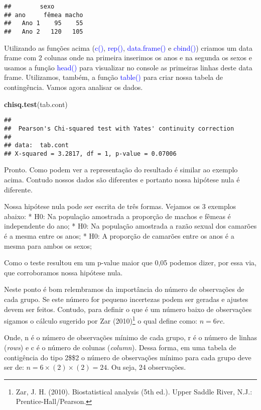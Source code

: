 \documentclass[titlepage, oneside, openany, a4paper]{book}
\newenvironment{Shaded}{\begin{snugshade}}{\end{snugshade}}
\newcommand{\KeywordTok}[1]{\textcolor[rgb]{0.13,0.29,0.53}{\textbf{#1}}}
\newcommand{\NormalTok}[1]{#1}
\begin{document}
\begin{verbatim}
##        sexo
## ano     fêmea macho
##   Ano 1    95    55
##   Ano 2   120   105
\end{verbatim}

Utilizando as funções acima (\textcolor{blue}{c()}, \textcolor{blue}{rep()}, \textcolor{blue}{data.frame()} e \textcolor{blue}{cbind()}) criamos um data frame com 2 colunas onde na primeira inserimos os anos e na segunda os sexos e usamos a função \textcolor{blue}{head()} para visualizar no console as primeiras linhas deste data frame. Utilizamos, também, a função \textcolor{blue}{table()} para criar nossa tabela de contingência. Vamos agora analisar os dados.

\begin{Shaded}
\begin{Highlighting}[]
\KeywordTok{chisq.test}\NormalTok{(tab.cont)}
\end{Highlighting}
\end{Shaded}

\begin{verbatim}
## 
##  Pearson's Chi-squared test with Yates' continuity correction
## 
## data:  tab.cont
## X-squared = 3.2817, df = 1, p-value = 0.07006
\end{verbatim}

Pronto. Como podem ver a representação do resultado é similar ao exemplo acima. Contudo nossos dados são diferentes e portanto nossa hipótese nula é diferente.

Nossa hipótese nula pode ser escrita de três formas. Vejamos os 3 exemplos abaixo:
* H0: Na população amostrada a proporção de machos e fêmeas é independente do ano;
* H0: Na população amostrada a razão sexual dos camarões é a mesma entre os anos;
* H0: A proporção de camarões entre os anos é a mesma para ambos os sexos;

Como o teste resultou em um p-value maior que 0,05 podemos dizer, por essa via, que corroboramos nossa hipótese nula.

Neste ponto é bom relembramos da importância do número de observações de cada grupo. Se este número for pequeno incertezas podem ser geradas e ajustes devem ser feitos. Contudo, para definir o que é um número baixo de observações sigamos o cálculo sugerido por Zar (2010)\footnote{Zar, J. H. (2010). Biostatistical analysis (5th ed.). Upper Saddle River, N.J.: Prentice-Hall/Pearson.} o qual define como: \(n = 6rc\).

Onde, n é o número de observações mínimo de cada grupo, r é o número de linhas (\emph{rows}) e c é o número de colunas (\emph{column}). Dessa forma, em uma tabela de contigência do tipo 2\$\times\$2 o número de observações mínimo para cada grupo deve ser de: \(n = 6 \times (2) \times (2) = 24\). Ou seja, 24 observações.
\end{document}
